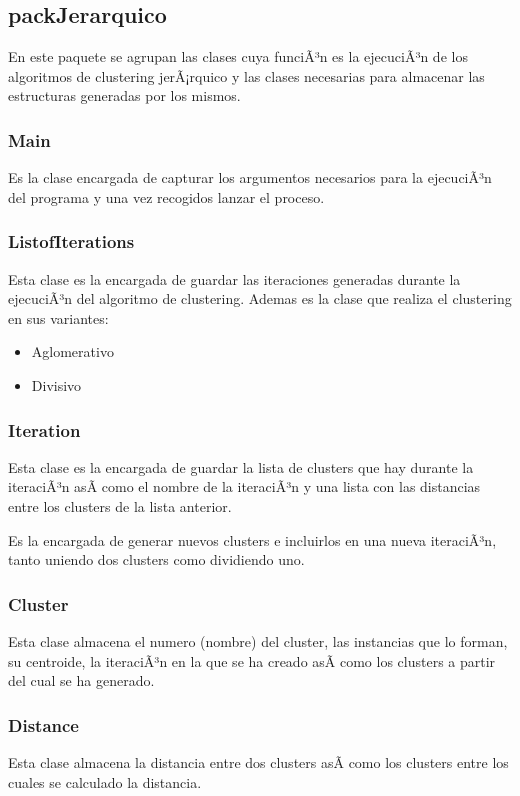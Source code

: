 \documentclass[11pt, titlepage,a4paper]{article}
\begin{document}
\subsection{packJerarquico}
En este paquete se agrupan las clases cuya funciÃ³n es la ejecuciÃ³n de los
algoritmos de clustering jerÃ¡rquico y las clases necesarias para almacenar las
estructuras generadas por los mismos.

\subsubsection{Main}
Es la clase encargada de capturar los argumentos necesarios para la ejecuciÃ³n
del programa y una vez recogidos lanzar el proceso.
 
\subsubsection{ListofIterations}
Esta clase es la encargada de guardar las iteraciones generadas durante la
ejecuciÃ³n del algoritmo de clustering. Ademas es la clase que realiza el
clustering en sus variantes:
\begin{itemize}
  \item Aglomerativo
  \item Divisivo
\end{itemize}

\subsubsection{Iteration}
Esta clase es la encargada de guardar la lista de clusters que hay durante la
iteraciÃ³n asÃ­ como el nombre de la iteraciÃ³n y una lista con las distancias
entre los clusters de la lista anterior.

Es la encargada de generar nuevos clusters e incluirlos en una nueva iteraciÃ³n,
tanto uniendo dos clusters como dividiendo uno.

\subsubsection{Cluster}
Esta clase almacena el numero (nombre) del cluster, las instancias que lo forman,
su centroide, la iteraciÃ³n en la que se ha creado asÃ­ como los clusters a partir
del cual se ha generado.

\subsubsection{Distance}
Esta clase almacena la distancia entre dos clusters asÃ­ como los clusters entre
los cuales se calculado la distancia.
\end{document}
